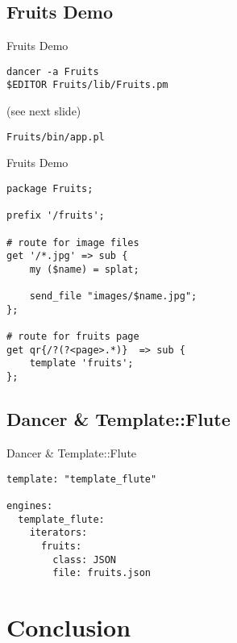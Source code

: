 \subsection{Fruits Demo}
\begin{frame}[fragile]{Fruits Demo}
\begin{lstlisting}
dancer -a Fruits
$EDITOR Fruits/lib/Fruits.pm
\end{lstlisting}

(see next slide)

\begin{lstlisting}
Fruits/bin/app.pl
\end{lstlisting}
\end{frame}

\begin{frame}[fragile]{Fruits Demo}
\begin{lstlisting}
package Fruits;

prefix '/fruits';

# route for image files
get '/*.jpg' => sub {
    my ($name) = splat;

    send_file "images/$name.jpg";
};

# route for fruits page
get qr{/?(?<page>.*)}  => sub {
    template 'fruits';
};
\end{lstlisting}
\end{frame}

\subsection{Dancer \& Template::Flute}
\begin{frame}[fragile]{Dancer \& Template::Flute}
\begin{lstlisting}
template: "template_flute"

engines:
  template_flute:
    iterators:
      fruits:
        class: JSON
        file: fruits.json
\end{lstlisting}
\end{frame}

\section{Conclusion}
